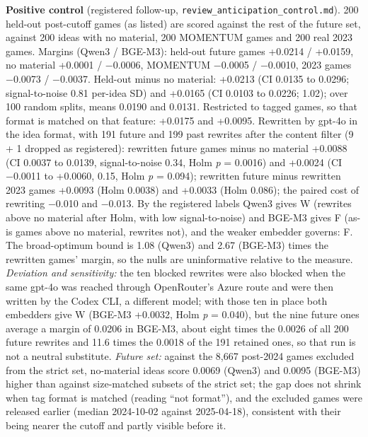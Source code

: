 \documentclass[
  10pt,
]{article}
\begin{document}
\textbf{Positive control} (registered
follow-up,
\texttt{review\_\allowbreak{}anticipation\_\allowbreak{}control.md}).
200 held-out post-cutoff games (as
listed) are scored against the rest of
the future set, against 200 ideas with
no material, 200 MOMENTUM games and 200
real 2023 games. Margins (Qwen3 /
BGE-M3): held-out future games +0.0214 /
+0.0159, no material +0.0001 / −0.0006,
MOMENTUM −0.0005 / −0.0010, 2023 games
−0.0073 / −0.0037. Held-out minus no
material: +0.0213 (CI 0.0135 to 0.0296;
signal-to-noise 0.81 per-idea SD) and
+0.0165 (CI 0.0103 to 0.0226; 1.02);
over 100 random splits, means 0.0190 and
0.0131. Restricted to tagged games, so
that format is matched on that feature:
+0.0175 and +0.0095. Rewritten by gpt-4o
in the idea format, with 191 future and
199 past rewrites after the content
filter (9 + 1 dropped as registered):
rewritten future games minus no material
+0.0088 (CI 0.0037 to 0.0139,
signal-to-noise 0.34, Holm \emph{p} =
0.0016) and +0.0024 (CI −0.0011 to
+0.0060, 0.15, Holm \emph{p} = 0.094);
rewritten future minus rewritten 2023
games +0.0093 (Holm 0.0038) and +0.0033
(Holm 0.086); the paired cost of
rewriting −0.010 and −0.013. By the
registered labels Qwen3 gives W
(rewrites above no material after Holm,
with low signal-to-noise) and BGE-M3
gives F (as-is games above no material,
rewrites not), and the weaker embedder
governs: F. The broad-optimum bound is
1.08 (Qwen3) and 2.67 (BGE-M3) times the
rewritten games' margin, so the nulls
are uninformative relative to the
measure. \emph{Deviation and
sensitivity:} the ten blocked rewrites
were also blocked when the same gpt-4o
was reached through OpenRouter's Azure
route and were then written by the Codex
CLI, a different model; with those ten
in place both embedders give W (BGE-M3
+0.0032, Holm \emph{p} = 0.040), but the
nine future ones average a margin of
0.0206 in BGE-M3, about eight times the
0.0026 of all 200 future rewrites and
11.6 times the 0.0018 of the 191
retained ones, so that run is not a
neutral substitute. \emph{Future set:}
against the 8,667 post-2024 games
excluded from the strict set,
no-material ideas score 0.0069 (Qwen3)
and 0.0095 (BGE-M3) higher than against
size-matched subsets of the strict set;
the gap does not shrink when tag format
is matched (reading ``not format''), and
the excluded games were released earlier
(median 2024-10-02 against 2025-04-18),
consistent with their being nearer the
cutoff and partly visible before it.
\end{document}
